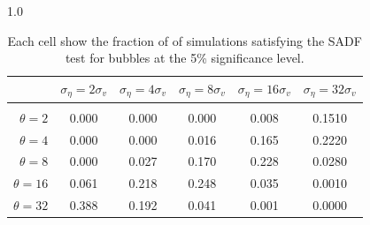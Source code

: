 \documentclass[12pt]{article}
\begin{document}
\begin{table}[h!]
\vspace{10pt}
\begin{subtable}{1.0\textwidth}
    \centering
\begin{tabular}{rccccc}
\hline  
            & \multicolumn{1}{l}{$\sigma_{\eta} =2\sigma_{v}$} & \multicolumn{1}{l}{$\sigma_{\eta} =4\sigma_{v}$} & \multicolumn{1}{l}{$\sigma_{\eta} =8\sigma_{v}$} & \multicolumn{1}{l}{$\sigma_{\eta} =16\sigma_{v}$} & \multicolumn{1}{l}{$\sigma_{\eta} =32\sigma_{v}$} \\ \hline  \vspace{-3mm} \\        
$\theta=2$  & 0.000                                             & 0.000                                             & 0.000                                             & 0.008                                              & 0.1510                                             \\ \hline
$\theta=4$  & 0.000                                             & 0.000                                             & 0.016                                             & 0.165                                              & 0.2220                                             \\ \hline
$\theta=8$  & 0.000                                             & 0.027                                             & 0.170                                             & 0.228                                              & 0.0280                                             \\ \hline
$\theta=16$ & 0.061                                             & 0.218                                             & 0.248                                             & 0.035                                              & 0.0010                                             \\ \hline
$\theta=32$ & 0.388                                             & 0.192                                             & 0.041                                             & 0.001                                              & 0.0000                                             \\ \hline
\end{tabular}
\end{subtable}

\caption{Each cell show the fraction of of simulations satisfying the SADF test for bubbles at the 5\% significance level.}
\label{SADFestsamps}
\end{table}
\pagebreak
\end{document}
